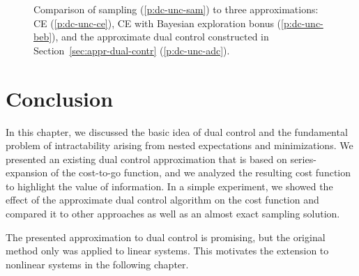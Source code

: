 \begin{figure}
  \setlength{}
  \setlength\figureheight{0.618\figurewidth}
  \footnotesize
  \caption[Comparison of sampling to three approximations.]{Comparison
    of sampling (\ref*{p:dc-unc-sam}) to three approximations: CE
    (\ref*{p:dc-unc-ce}), CE with Bayesian exploration bonus
    (\ref*{p:dc-unc-beb}), and the approximate dual
    control constructed in Section~\ref{sec:appr-dual-contr}
    (\ref*{p:dc-unc-adc}).}
  \label{fig:dc_uncertain_b}
\end{figure}

\section{Conclusion}

In this chapter, we discussed the basic idea of dual control and the
fundamental problem of intractability arising from nested expectations and
minimizations. We presented an existing dual control approximation that is
based on series-expansion of the cost-to-go function, and we analyzed the
resulting cost function to highlight the value of information. In a simple
experiment, we showed the effect of the approximate dual control algorithm on
the cost function and compared it to other approaches as well as an almost
exact sampling solution.

The presented approximation to dual control is promising, but the original
method only was applied to linear systems. This motivates the extension
to nonlinear systems in the following chapter.
